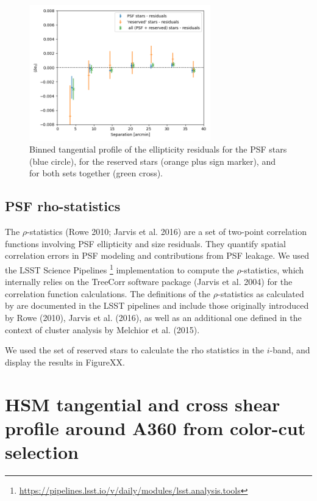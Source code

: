 \documentclass[SE,lsstdraft,authoryear,toc]{lsstdoc}
\begin{document}
\begin{figure}
\centering
\includegraphics[width=0.7\textwidth]{Figures/residual_tan_profile_CLMM.png}
\caption{Binned tangential profile of the ellipticity residuals for the PSF stars (blue circle), for the reserved stars (orange plus sign marker), and for both sets together (green cross).\label{fig:res_profile}}
\end{figure}


\subsection{PSF rho-statistics}
The $\rho$-statistics (Rowe 2010; Jarvis et al. 2016) are a set of two-point correlation functions involving PSF ellipticity and size residuals. They quantify spatial correlation errors in PSF modeling and contributions from PSF leakage. We used the LSST Science Pipelines \footnote{\url{https://pipelines.lsst.io/v/daily/modules/lsst.analysis.tools}} implementation to compute the $\rho$-statistics, which internally relies on the TreeCorr software package (Jarvis et al. 2004) for the correlation function calculations. The definitions of the $\rho$-statistics as calculated by  are documented in the LSST pipelines and include those originally introduced by Rowe (2010), Jarvis et al. (2016), as well as an additional one defined in the context of cluster analysis by Melchior et al. (2015).

We used the set of reserved stars to calculate the rho statistics in the $i$-band, and display the results in FigureXX.

\section{HSM tangential and cross shear profile around A360 from color-cut selection}
\label{sec:shear_profile}
\appendix
\end{document}
